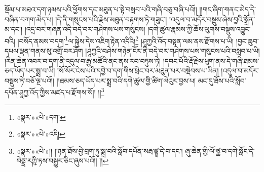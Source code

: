 སྡོམ་པ་མཐའ་དག་ཉམས་པའི་ཕྱོགས་དང་མཐུན་པ་སྟེ་བསླབ་པའི་གཞི་བཅུ་བཞི་པའོ།། །།གང་ཞིག་གནང་མེད་དེ་བཞིན་བཀག་མེད་པ། །དེ་ནི་གསུངས་པའི་རྗེས་མཐུན་བརྟགས་ཏེ་གཟུང་། །འདུལ་བ་མདོར་བསྡུས་ཞེས་བྱའི་སྒྲོན་མ་དང་། །འདྲ་བར་གཞན་འདི་བདེ་བར་གཤེགས་པས་གསུངས། །དགེ་ཚུལ་རྣམས་ཀྱི་ཆོས་ལུགས་བསྡུས་འབྱུང་བའི། །བསོད་ནམས་བདག་\footnote{«སྣར་»«པེ་»དག་}ལ་སྐྱེས་དེས་འཇིག་རྟེན་འདིའི།\footnote{«སྣར་»«པེ་»འདི།} །ཤཱཀྱའི་འོད་བསྟན་ལམ་ནས་རྫོགས་པ་ཡི། །བྱང་ཆུབ་དཔལ་ལྡན་གནས་སུ་འགྲོ་བར་ཤོག །ཤཱཀྱའི་བཤེས་གཉེན་ངོར་ནི་བདེ་བར་གཤེགས་པས་གསུངས་པའི་བསླབ་པ་ཡི། །རིན་ཆེན་འབར་བ་དག་ནི་འདུལ་བ་རྒྱ་མཚོའི་ནང་ནས་རབ་བཏུས་ཏེ། །དབང་པོའི་རྡོ་རྗེས་ཕུག་ནས་དེ་གཞི་ཐམས་ཅད་ཡོད་པར་སྨྲ་བ་ཡི། །སོ་སོར་ངེས་པའི་དབྱེ་བ་དག་གིས་ཕྲེང་བར་མཐུན་པར་བསྡེབས་པ་ཡིན། །འདུལ་བ་མདོར་བསྡུས་ཏེ་བཅོ་ལྔ་པའོ།། །།ཐམས་ཅད་ཡོད་པར་སྨྲ་བའི་དགེ་ཚུལ་གྱི་ཚིག་ལེའུར་བྱས་པ། མང་དུ་ཐོས་པའི་སློབ་དཔོན་ཤཱཀྱ་འོད་ཀྱིས་མཛད་པ་རྫོགས་སོ།། །།\footnote{«སྣར་»«པེ་»།། །།ཉན་ཐོས་བྱེ་བྲག་ཏུ་སྨྲ་བའི་སློབ་དཔོན་སརྦ་ཛྙཱ་དེ་བ་དང་། ཞུ་ཆེན་གྱི་ལོ་ཙྪ་བ་དགེ་སློང་དེ་བེནྡྲ་རཀྵི་ཏས་བསྒྱུར་ཅིང་ཞུས་པའོ།། །།}